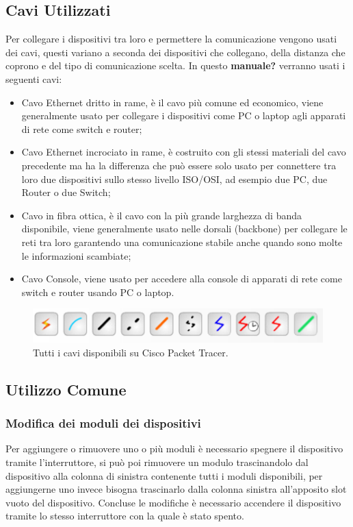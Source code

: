 \subsection{Cavi Utilizzati}
Per collegare i dispositivi tra loro e permettere la comunicazione vengono usati dei cavi, questi variano a seconda dei dispositivi che collegano, della distanza che coprono e del tipo di comunicazione scelta.\newline
\smallskip
\newline
In questo \textbf{manuale?} verranno usati i seguenti cavi:

\begin{itemize}
    \item Cavo Ethernet dritto in rame, è il cavo più comune ed economico, viene generalmente usato per collegare i dispositivi come PC o laptop agli apparati di rete come switch e router;
    \item Cavo Ethernet incrociato in rame, è costruito con gli stessi materiali del cavo precedente ma ha la differenza che può essere solo usato per connettere tra loro due dispositivi sullo stesso livello ISO/OSI, ad esempio due PC, due Router o due Switch;
    \item Cavo in fibra ottica, è il cavo con la più grande larghezza di banda disponibile, viene generalmente usato nelle dorsali (backbone) per collegare le reti tra loro garantendo una comunicazione stabile anche quando sono molte le informazioni scambiate;
    \item Cavo Console, viene usato per accedere alla console di apparati di rete come switch e router usando PC o laptop.
\end{itemize}

\begin{figure}[htbp]
    \centerline{\includegraphics[scale=.4]{images/02.packet-tracer/cavi.png}}
    \caption{Tutti i cavi disponibili su Cisco Packet Tracer.}
\end{figure}

\subsection{Utilizzo Comune}

\subsubsection{Modifica dei moduli dei dispositivi}
Per aggiungere o rimuovere uno o più moduli è necessario spegnere il dispositivo tramite l'interruttore, si può poi rimuovere un modulo trascinandolo dal dispositivo alla colonna di sinistra contenente tutti i moduli disponibili, per aggiungerne uno invece bisogna trascinarlo dalla colonna sinistra all'apposito slot vuoto del dispositivo. Concluse le modifiche è necessario accendere il dispositivo tramite lo stesso interruttore con la quale è stato spento.

